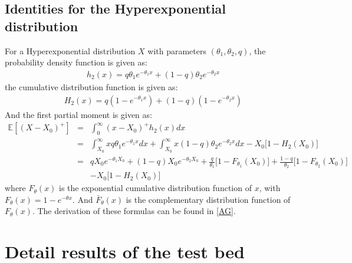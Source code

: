\documentclass[preprint,12pt]{elsarticle}
\begin{document}
\begin{appendices}
\subsection{Identities for the Hyperexponential distribution}
For a Hyperexponential distribution $X$ with parameters $(\theta_1,\theta_2,q)$, the probability density function is given as:
\begin{eqnarray}
h_{2}(x) = q\theta_{1}e^{-\theta_{1}x} + (1-q)\theta_{2}e^{-\theta_{2}x} \nonumber
\end{eqnarray}
the cumulative distribution function is given as:
\begin{eqnarray}
H_{2}(x) = q(1-e^{-\theta_{1}x})+(1-q)(1-e^{-\theta_{2}x}) \nonumber
\end{eqnarray}
And the first partial moment is given as:
\begin{eqnarray}
\mathbb{E}{[(X-X_{0})^{+}]} &=& \int^{\infty}_{0}(x-X_{0})^{+}h_{2}(x)dx \nonumber\\
&=& \int^{\infty}_{X_{0}}{xq\theta_{1}e^{-\theta_{1}x}dx} + \int^{\infty}_{X_{0}}{x(1-q)\theta_{2}e^{-\theta_{2}x}dx}-X_{0}\bigg[1-H_{2}(X_{0}) \bigg] \nonumber\\
&=& qX_{0}e^{-\theta_{1}X_{0}} + (1-q)X_{0}e^{-\theta_{2}X_{0}} + \frac{q}{\theta_{1}}\bigg[1-F_{\theta_{1}}(X_{0})\bigg]+\frac{1-q}{\theta_{2}}\bigg[1-F_{\theta_{2}}(X_{0}) \bigg] \nonumber\\
&&-X_{0}\bigg[ 1- H_{2}(X_{0})\bigg] \nonumber
\end{eqnarray}
where $F_{\theta}(x)$ is the exponential cumulative distribution function of $x$, with $F_{\theta}(x)= 1-e^{-\theta x}$. And $\bar{F}_{\theta}(x)$ is the complementary distribution function of $F_{\theta}(x)$.
The derivation of these formulas can be found in \ref{AG}.

\section{Detail results of the test bed}
\label{detailapptable}


\end{appendices}
\end{document}
